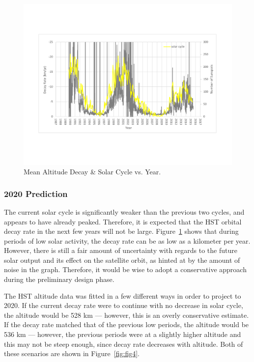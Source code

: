 \documentclass[paper=letter, fontsize=11pt]{scrartcl} %
\numberwithin{equation}{section} %
\numberwithin{figure}{section} %
\numberwithin{table}{section} %
\begin{document}
\begin{figure}[H]
    \begin{center}
        \includegraphics[width=1\textwidth]{figs2/3.pdf}
        \caption{Mean Altitude Decay \& Solar Cycle vs. Year.}
        \label{fig:fig3}
    \end{center}
\end{figure}


\subsubsection{2020 Prediction}
The current solar cycle is significantly weaker than the previous two cycles, and appears to have already peaked. Therefore, it is expected that the HST orbital decay rate in the next few years will not be large. Figure~\ref{fig:fig3} shows that during periods of low solar activity, the decay rate can be as low as a kilometer per year. However, there is still a fair amount of uncertainty with regards to the future solar output and its effect on the satellite orbit, as hinted at by the amount of noise in the graph. Therefore, it would be wise to adopt a conservative approach during the preliminary design phase.

The HST altitude data was fitted in a few different ways in order to project to 2020. If the current decay rate were to continue with no decrease in solar cycle, the altitude would be 528 km --- however, this is an overly conservative estimate. If the decay rate matched that of the previous low periods, the altitude would be 536 km --- however, the previous periods were at a slightly higher altitude and this may not be steep enough, since decay rate decreases with altitude. Both of these scenarios are shown in Figure~\ref{fig:fig4}.
\end{document}
